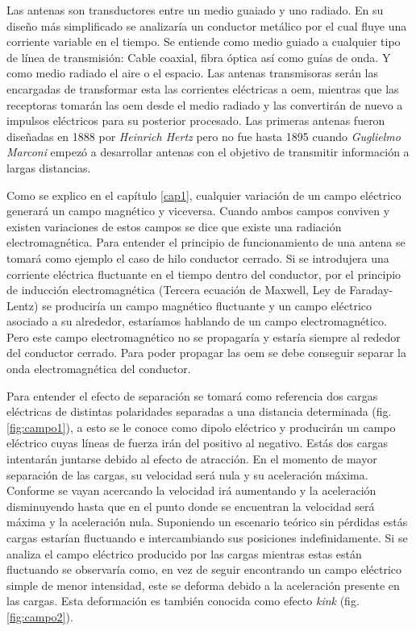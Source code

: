 \par Las antenas son transductores entre un medio guaiado y uno radiado. En su diseño más simplificado se analizaría un conductor metálico por el cual fluye una corriente variable en el tiempo. Se entiende como medio guiado a cualquier tipo de línea de transmisión: Cable coaxial, fibra óptica así como guías de onda. Y como medio radiado el aire o el espacio. Las antenas transmisoras serán las encargadas de transformar esta las corrientes eléctricas a \gls{oem}, mientras que las receptoras tomarán las \gls{oem} desde el medio radiado y las convertirán de nuevo a impulsos eléctricos para su posterior procesado. Las primeras antenas fueron diseñadas en 1888 por \textit{Heinrich Hertz} pero no fue hasta 1895 cuando \textit{Guglielmo Marconi} empezó a desarrollar antenas con el objetivo de transmitir información a largas distancias.
\\
\par Como se explico en el capítulo \ref{cap1}, cualquier variación de un campo eléctrico generará un campo magnético y viceversa. Cuando ambos campos conviven y existen variaciones de estos campos se dice que existe una radiación electromagnética. Para entender el principio de funcionamiento de una antena se tomará como ejemplo el caso de hilo conductor cerrado. Si se introdujera una corriente eléctrica fluctuante en el tiempo dentro del conductor, por el principio de inducción electromagnética (Tercera ecuación de Maxwell, Ley de Faraday-Lentz) se produciría un campo magnético fluctuante y un campo eléctrico asociado a su alrededor, estaríamos hablando de un campo electromagnético. Pero este campo electromagnético no se propagaría y estaría siempre al rededor del conductor cerrado. Para poder propagar las \gls{oem} se debe conseguir separar la onda electromagnética del conductor.
\\
\par Para entender el efecto de separación se tomará como referencia dos cargas eléctricas de distintas polaridades separadas a una distancia determinada (fig. \ref{fig:campo1}), a esto se le conoce como dipolo eléctrico y producirán un campo eléctrico cuyas líneas de fuerza irán del positivo al negativo. Estás dos cargas intentarán juntarse debido al efecto de atracción. En el momento de mayor separación de las cargas, su velocidad será nula y su aceleración máxima. Conforme se vayan acercando la velocidad irá aumentando y la aceleración disminuyendo hasta que en el punto donde se encuentran la velocidad será máxima y la aceleración nula. Suponiendo un escenario teórico sin pérdidas estás cargas estarían fluctuando e intercambiando sus posiciones indefinidamente. Si se analiza el campo eléctrico producido por las cargas mientras estas están fluctuando se observaría como, en vez de seguir encontrando un campo eléctrico simple de menor intensidad, este se deforma debido a la aceleración presente en las cargas. Esta deformación es también conocida como efecto \textit{kink} (fig. \ref{fig:campo2}).
